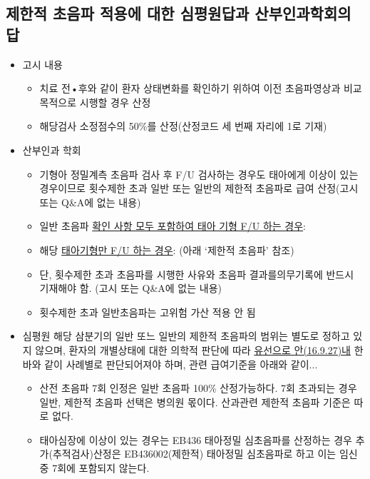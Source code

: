 \subsection{제한적 초음파 적용에 대한 심평원답과 산부인과학회의 답}\par
\begin{itemize}\tightlist
\item 고시 내용
	\begin{itemize}\tightlist
	\item 치료 전•후와 같이 환자 상태변화를 확인하기 위하여 이전 초음파영상과 비교목적으로 시행할 경우 산정 
	\item 해당검사 소정점수의 50\%를 산정(산정코드 세 번째 자리에 1로 기재)
	\end{itemize}
\item 산부인과 학회
	\begin{itemize}\tightlist
	\item 기형아 정밀계측 초음파 검사 후 F/U 검사하는 경우도 태아에게 이상이 있는 경우이므로 횟수제한 초과 일반 또는 일반의 제한적 초음파로 급여 산정(고시 또는 \textsf{Q\&A}에 없는 내용)
	\item 일반 초음파 \uline{확인 사항 모두 포함하여 태아 기형 F/U 하는 경우}: 
	\item 해당 \uline{태아기형만 F/U 하는 경우}:  (아래 ‘제한적 초음파’ 참조)
	\item 단, 횟수제한 초과 초음파를 시행한 사유와 초음파 결과를의무기록에 반드시 기재해야 함. (고시 또는 \textsf{Q\&A}에 없는 내용)
	\item 횟수제한 초과 일반초음파는 고위험 가산 적용 안 됨 
	\end{itemize}
\item 심평원 해당 삼분기의 일반 또느 일반의 제한적 초음파의 범위는 별도로 정하고 있지 않으며, 환자의 개별상태에 대한 의학적 판단에 따라 \uline{유선으로 안(16.9.27)내} 한 바와 같이 사례별로 판단되어져야 하며, 관련 급여기준을 아래와 같이...
	\begin{itemize}\tightlist
	\item 산전 초음파 7회 인정은 일반 초음파 100\% 산정가능하다. 7회 초과되는 경우 일반, 제한적 초음파 선택은 병의원 몫이다. 산과관련 제한적 초음파 기준은 따로 없다.
	\item 태아심장에 이상이 있는 경우는 EB436 태아정밀 심초음파를 산정하는 경우 추가(추적검사)산정은 EB436002(제한적) 태아정밀 심초음파로 하고 이는 임신중 7회에 포함되지 않는다.
	\end{itemize}
\end{itemize}	
\prezi{\clearpage}

